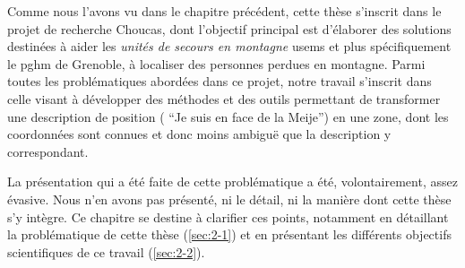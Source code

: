 Comme nous l'avons vu dans le chapitre précédent, cette thèse
s'inscrit dans le projet de recherche Choucas, dont l'objectif
principal est d’élaborer des solutions destinées à aider les
\emph{unités de secours en montagne} \acp{usem} et plus spécifiquement
le \ac{pghm} de Grenoble, à localiser des personnes perdues en
montagne. Parmi toutes les problématiques abordées dans ce projet,
notre travail s'inscrit dans celle visant à développer des méthodes et
des outils permettant de transformer une description de position (\eg
\enquote{Je suis en face de la Meije}) en une zone, dont les
coordonnées sont connues et donc moins ambiguë que la description y
correspondant.

La présentation qui a été faite de cette problématique a été,
volontairement, assez évasive. Nous n'en avons pas présenté, ni le
détail, ni la manière dont cette thèse s'y intègre. Ce chapitre se
destine à clarifier ces points, notamment en détaillant la
problématique de cette thèse (\autoref{sec:2-1}) et en présentant les
différents objectifs scientifiques de ce travail (\autoref{sec:2-2}).

